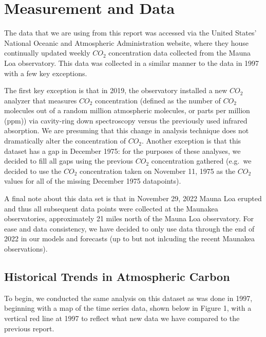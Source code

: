 \documentclass[AER]{AEA}
\begin{document}
\hypertarget{measurement-and-data}{%
\section{Measurement and Data}\label{measurement-and-data}}

The data that we are using from this report was accessed via the United
States' National Oceanic and Atmospheric Administration website, where
they house continually updated weekly \(CO_{2}\) concentration data
collected from the Mauna Loa observatory. This data was collected in a
similar manner to the data in 1997 with a few key exceptions.

The first key exception is that in 2019, the observatory installed a new
\(CO_{2}\) analyzer that measures \(CO_{2}\) concentration (defined as
the number of \(CO_{2}\) molecules out of a random million atmospheric
molecules, or parts per million (ppm)) via cavity-ring down spectroscopy
versus the previously used infrared absorption. We are presuming that
this change in analysis technique does not dramatically alter the
concentration of \(CO_{2}\). Another exception is that this dataset has
a gap in December 1975: for the purposes of these analyses, we decided
to fill all gaps using the previous \(CO_{2}\) concentration gathered
(e.g.~we decided to use the \(CO_{2}\) concentration taken on November
11, 1975 as the \(CO_{2}\) values for all of the missing December 1975
datapoints).

A final note about this data set is that in November 29, 2022 Mauna Loa
erupted and thus all subsequent data points were collected at the
Maunakea observatories, approximately 21 miles north of the Mauna Loa
observatory. For ease and data consistency, we have decided to only use
data through the end of 2022 in our models and forecasts (up to but not
inlcuding the recent Maunakea observations).

\hypertarget{historical-trends-in-atmospheric-carbon}{%
\subsection{Historical Trends in Atmospheric
Carbon}\label{historical-trends-in-atmospheric-carbon}}

To begin, we conducted the same analysis on this dataset as was done in
1997, beginning with a map of the time series data, shown below in
Figure 1, with a vertical red line at 1997 to reflect what new data we
have compared to the previous report.
\end{document}

